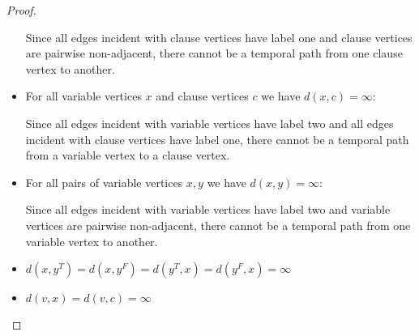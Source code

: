\documentclass[11pt,a4paper]{article}
\theoremstyle{remark}
\theoremstyle{definition}
\begin{document}
\begin{proof}
\begin{itemize}
Since all edges incident with clause vertices have label one and clause vertices are pairwise non-adjacent, there cannot be a temporal path from one clause vertex to another.
\item For all variable vertices $x$ and clause vertices $c$ we have $d(x,c)=\infty$:

Since all edges incident with variable vertices have label two and all edges incident with clause vertices have label one, there cannot be a temporal path from a variable vertex to a clause vertex.
\item For all pairs of variable vertices $x,y$ we have $d(x,y)=\infty$:

Since all edges incident with variable vertices have label two and variable vertices are pairwise non-adjacent, there cannot be a temporal path from one variable vertex to another.
\item $d(x,y^T)=d(x,y^F)=d(y^T,x)=d(y^F,x)=\infty$
\item $d(v,x)=d(v,c)=\infty$
\end{itemize}
\end{proof}

	
\end{document}
